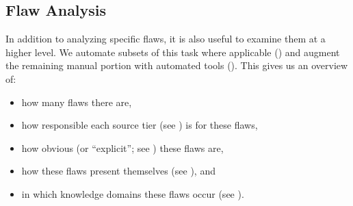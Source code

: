 \subsection{Flaw Analysis}
\label{flaw-analysis}

In addition to analyzing specific flaws, it is also useful to examine them at
a higher level. We automate subsets of this task where applicable
() and augment the remaining manual portion with
automated tools (). This gives us an overview of:
\begin{itemize}
    \item how many flaws there are,
    \item how responsible each source tier (see ) is for these flaws,
    \item how obvious (or ``explicit''; see ) these flaws are,
    \item how these flaws present themselves (see ), and
    \item in which knowledge domains these flaws occur (see ).
\end{itemize}

